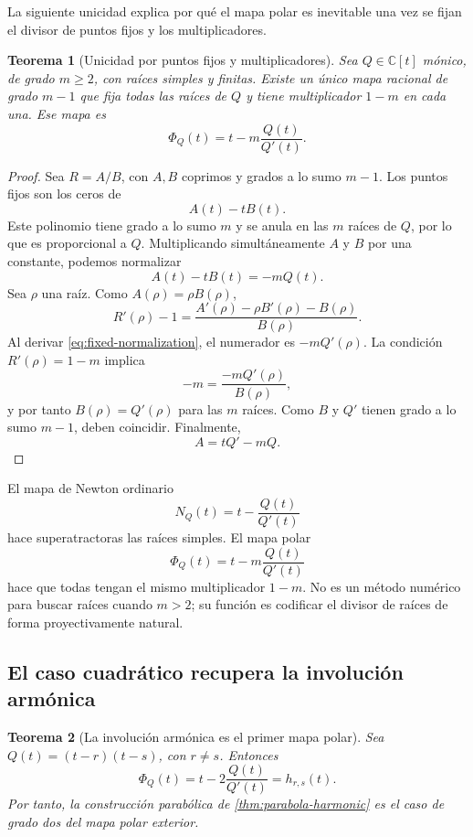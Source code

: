 \documentclass[11pt,oneside]{scrartcl}
\theoremstyle{plainblue}
\newtheorem{theorem}{Teorema}[section]
\theoremstyle{definitionblue}
\theoremstyle{remarkgray}
\newcommand{\CC}{\mathbb{C}}
\begin{document}
La siguiente unicidad explica por qué el mapa polar es inevitable una vez se fijan el
divisor de puntos fijos y los multiplicadores.

\begin{theorem}[Unicidad por puntos fijos y multiplicadores]\label{thm:uniqueness}
Sea \(Q\in\CC[t]\) mónico, de grado \(m\ge2\), con raíces simples y finitas. Existe
un único mapa racional de grado \(m-1\) que fija todas las raíces de \(Q\) y tiene
multiplicador \(1-m\) en cada una. Ese mapa es
\[
\Phi_Q(t)=t-m\frac{Q(t)}{Q'(t)}.
\]
\end{theorem}

\begin{proof}
Sea \(R=A/B\), con \(A,B\) coprimos y grados a lo sumo \(m-1\). Los puntos fijos
son los ceros de
\[
A(t)-tB(t).
\]
Este polinomio tiene grado a lo sumo \(m\) y se anula en las \(m\) raíces de \(Q\),
por lo que es proporcional a \(Q\). Multiplicando simultáneamente \(A\) y \(B\) por
una constante, podemos normalizar
\begin{equation}\label{eq:fixed-normalization}
A(t)-tB(t)=-mQ(t).
\end{equation}
Sea \(\rho\) una raíz. Como \(A(\rho)=\rho B(\rho)\),
\[
R'(\rho)-1
=\frac{A'(\rho)-\rho B'(\rho)-B(\rho)}{B(\rho)}.
\]
Al derivar \cref{eq:fixed-normalization}, el numerador es \(-mQ'(\rho)\). La
condición \(R'(\rho)=1-m\) implica
\[
-m=\frac{-mQ'(\rho)}{B(\rho)},
\]
y por tanto \(B(\rho)=Q'(\rho)\) para las \(m\) raíces. Como \(B\) y \(Q'\)
tienen grado a lo sumo \(m-1\), deben coincidir. Finalmente,
\[
A=tQ'-mQ.
\]
\end{proof}

\begin{researchbox}
El mapa de Newton ordinario
\[
N_Q(t)=t-\frac{Q(t)}{Q'(t)}
\]
hace superatractoras las raíces simples. El mapa polar
\[
\Phi_Q(t)=t-m\frac{Q(t)}{Q'(t)}
\]
hace que todas tengan el mismo multiplicador \(1-m\). No es un método numérico para
buscar raíces cuando \(m>2\); su función es codificar el divisor de raíces de forma
proyectivamente natural.
\end{researchbox}

\subsection{El caso cuadrático recupera la involución armónica}

\begin{theorem}[La involución armónica es el primer mapa polar]\label{thm:quadratic-polar-harmonic}
Sea \(Q(t)=(t-r)(t-s)\), con \(r\ne s\). Entonces
\begin{equation}\label{eq:Phi2-harmonic}
\Phi_Q(t)=t-2\frac{Q(t)}{Q'(t)}=h_{r,s}(t).
\end{equation}
Por tanto, la construcción parabólica de \cref{thm:parabola-harmonic} es el caso de
grado dos del mapa polar exterior.
\end{theorem}
\end{document}
